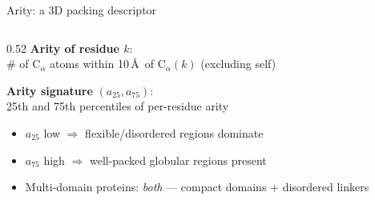\documentclass[aspectratio=169, 10pt]{beamer}
\begin{document}
\begin{frame}{Arity: a 3D packing descriptor}
  \begin{columns}[T]
    \begin{column}{0.52\textwidth}
      \textbf{Arity of residue $k$}:\\
      \# of $\mathrm{C}_\alpha$ atoms within 10\,\AA\ of $\mathrm{C}_\alpha(k)$
      (excluding self)
      \vspace{6pt}

      \textbf{Arity signature} $(a_{25}, a_{75})$:\\
      25th and 75th percentiles of per-residue arity
      \begin{itemize}
        \item $a_{25}$ low $\Rightarrow$ flexible/disordered regions dominate
        \item $a_{75}$ high $\Rightarrow$ well-packed globular regions present
        \item Multi-domain proteins: \emph{both} — compact domains
              + disordered linkers
      \end{itemize}
      \vspace{6pt}


\end{column}
\end{columns}
\end{frame}
\end{document}
